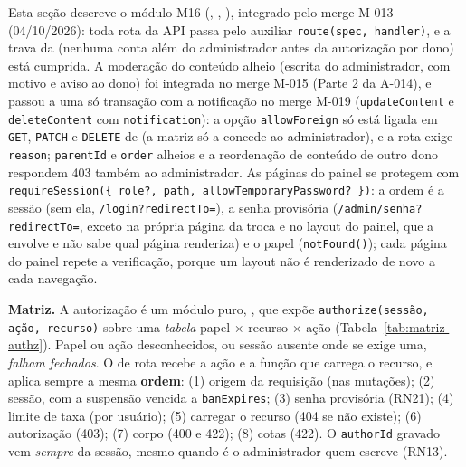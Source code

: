 Esta seção descreve o módulo M16 (, , ), integrado pelo merge M-013 (04/10/2026): toda rota da API passa pelo auxiliar \texttt{route(spec, handler)}, e a trava da  (nenhuma conta além do administrador antes da autorização por dono) está cumprida. A moderação do conteúdo alheio (escrita do administrador, com motivo e aviso ao dono) foi integrada no merge M-015 (Parte 2 da A-014), e passou a uma só transação com a notificação no merge M-019 (\texttt{updateContent} e \texttt{deleteContent} com \texttt{notification}): a opção \texttt{allowForeign} só está ligada em \texttt{GET}, \texttt{PATCH} e \texttt{DELETE} de  (a matriz só a concede ao administrador), e a rota exige \texttt{reason}; \texttt{parentId} e \texttt{order} alheios e a reordenação de conteúdo de outro dono respondem 403 também ao administrador. As páginas do painel se protegem com \texttt{requireSession(\{ role?, path, allowTemporaryPassword? \})}: a ordem é a sessão (sem ela, \texttt{/login?redirectTo=}), a senha provisória (\texttt{/admin/senha?redirectTo=}, exceto na própria página da troca e no layout do painel, que a envolve e não sabe qual página renderiza) e o papel (\texttt{notFound()}); cada página do painel repete a verificação, porque um layout não é renderizado de novo a cada navegação.

\textbf{Matriz.} A autorização é um módulo puro, , que expõe \texttt{authorize(sessão, ação, recurso)} sobre uma \emph{tabela} papel $\times$ recurso $\times$ ação (Tabela~\ref{tab:matriz-authz}). Papel ou ação desconhecidos, ou sessão ausente onde se exige uma, \emph{falham fechados}. O  de rota recebe a ação e a função que carrega o recurso, e aplica sempre a mesma \textbf{ordem}: (1) origem da requisição (nas mutações); (2) sessão, com a suspensão vencida a \texttt{banExpires}; (3) senha provisória (RN21); (4) limite de taxa (por usuário); (5) carregar o recurso (404 se não existe); (6) autorização (403); (7) corpo (400 e 422); (8) cotas (422). O \texttt{authorId} gravado vem \emph{sempre} da sessão, mesmo quando é o administrador quem escreve (RN13).

